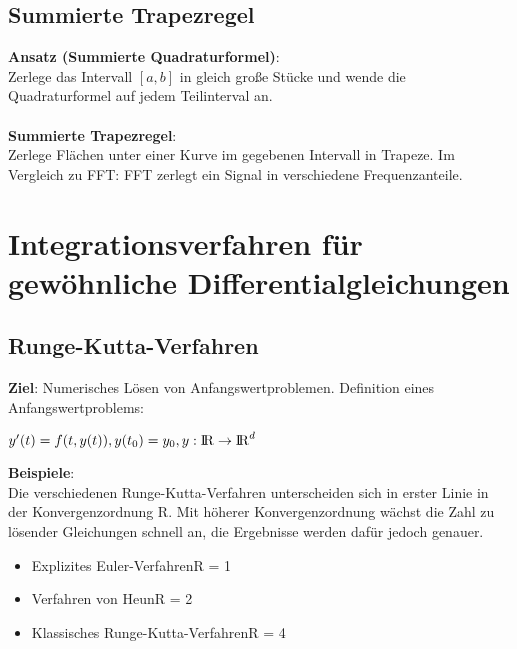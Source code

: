\documentclass[10pt,a4paper]{article}
\def\realnumbers{{\rm I\!R}}
\begin{document}
	\subsection{Summierte Trapezregel}
	\textbf{Ansatz (Summierte Quadraturformel)}:\\Zerlege das Intervall $[a, b]$ in gleich große Stücke und wende die Quadraturformel auf jedem Teilinterval an.\\\\
	\textbf{Summierte Trapezregel}:\\Zerlege Flächen unter einer Kurve im gegebenen Intervall in Trapeze. Im Vergleich zu FFT: FFT zerlegt ein Signal in verschiedene Frequenzanteile.

	\newpage
	\section{Integrationsverfahren für gewöhnliche Differentialgleichungen}
	\subsection{Runge-Kutta-Verfahren}
	\textbf{Ziel}: Numerisches Lösen von Anfangswertproblemen. Definition eines Anfangswertproblems:
	\begin{center} 
		$y'(t) = f(t, y(t)), y(t_0) = y_0, y: \realnumbers \rightarrow \realnumbers^d$
	\end{center}
	\textbf{Beispiele}:\\
	Die verschiedenen Runge-Kutta-Verfahren unterscheiden sich in erster Linie in der Konvergenzordnung R. Mit höherer Konvergenzordnung wächst die Zahl zu lösender Gleichungen schnell an, die Ergebnisse werden dafür jedoch genauer.
	\begin{itemize}
		\item Explizites Euler-Verfahren\hfill R = 1
		\item Verfahren von Heun\hfill R = 2
		\item Klassisches Runge-Kutta-Verfahren\hfill R = 4
	\end{itemize}
\end{document}
